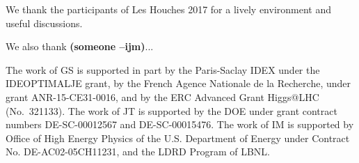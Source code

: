 \documentclass[11pt,letterpaper]{article}
\newcommand{\ijm}[1]{\textbf{\textcolor{llblue}{(#1 --ijm)}}}
\begin{document}
\begin{acknowledgments}

We thank the participants of Les Houches 2017 for a lively environment and useful discussions.

We also thank \ijm{someone}...

The work of GS is supported in part by the Paris-Saclay IDEX under the
IDEOPTIMALJE grant, by the French Agence Nationale de la Recherche,
under grant ANR-15-CE31-0016, and by the ERC Advanced Grant Higgs@LHC
(No.\ 321133).
%
The work of JT is supported by the DOE under grant contract numbers DE-SC-00012567 and DE-SC-00015476.
%
The work of IM is supported by Office of High Energy Physics of the U.S. Department of Energy under Contract No. DE-AC02-05CH11231, and the LDRD Program of LBNL.


\end{acknowledgments}







%
%
%
%
%
%

%
%
%
%
%
%
%
%
%
\end{document}
